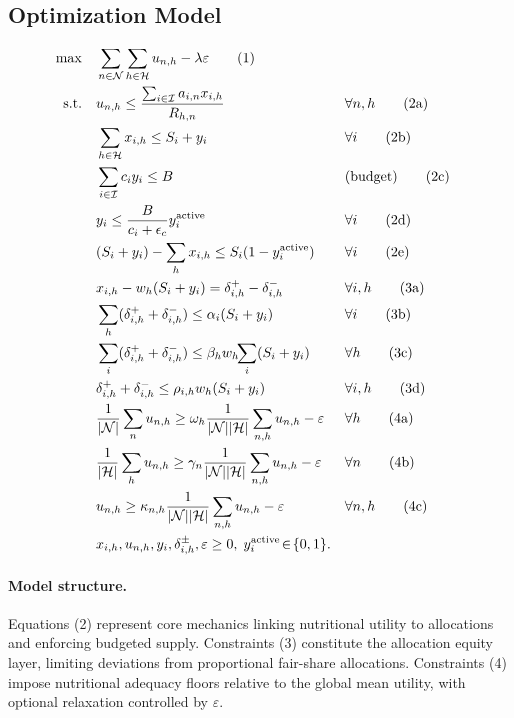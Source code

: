 \documentclass[preprint,12pt]{elsarticle}
\begin{document}
\subsection{Optimization Model}
\begin{align}
\max \quad & \sum_{n \in \mathcal{N}}\sum_{h \in \mathcal{H}} u_{n,h} - \lambda \varepsilon \tag{1}\\
\text{s.t.}\quad 
& u_{n,h} \le \frac{\sum_{i \in \mathcal{I}} a_{i,n} x_{i,h}}{R_{h,n}} && \forall n,h \tag{2a}\\
& \sum_{h \in \mathcal{H}} x_{i,h} \le S_i + y_i && \forall i \tag{2b}\\
& \sum_{i \in \mathcal{I}} c_i y_i \le B && \text{(budget)} \tag{2c}\\
& y_i \le \frac{B}{c_i+\epsilon_c} y_i^{\mathrm{active}} && \forall i \tag{2d}\\
& (S_i+y_i) - \sum_{h} x_{i,h} \le S_i(1-y_i^{\mathrm{active}}) && \forall i \tag{2e}\\
& x_{i,h} - w_h(S_i+y_i) = \delta_{i,h}^{+}-\delta_{i,h}^{-} && \forall i,h \tag{3a}\\
& \sum_{h} (\delta_{i,h}^{+}+\delta_{i,h}^{-}) \le \alpha_i (S_i+y_i) && \forall i \tag{3b}\\
& \sum_{i} (\delta_{i,h}^{+}+\delta_{i,h}^{-}) \le \beta_h w_h\!\!\sum_{i}(S_i+y_i) && \forall h \tag{3c}\\
& \delta_{i,h}^{+}+\delta_{i,h}^{-} \le \rho_{i,h}w_h(S_i+y_i) && \forall i,h \tag{3d}\\
& \frac{1}{|\mathcal{N}|}\sum_{n} u_{n,h} \ge \omega_h \frac{1}{|\mathcal{N}||\mathcal{H}|}\sum_{n,h} u_{n,h} - \varepsilon && \forall h \tag{4a}\\
& \frac{1}{|\mathcal{H}|}\sum_{h} u_{n,h} \ge \gamma_n \frac{1}{|\mathcal{N}||\mathcal{H}|}\sum_{n,h} u_{n,h} - \varepsilon && \forall n \tag{4b}\\
& u_{n,h} \ge \kappa_{n,h} \frac{1}{|\mathcal{N}||\mathcal{H}|}\sum_{n,h} u_{n,h} - \varepsilon && \forall n,h \tag{4c}\\
& x_{i,h},u_{n,h},y_i,\delta_{i,h}^{\pm},\varepsilon \ge 0,\; y_i^{\mathrm{active}}\!\in\!\{0,1\}. \notag
\end{align}

\paragraph{Model structure.}
Equations (2) represent core mechanics linking nutritional utility to allocations and enforcing budgeted supply. Constraints (3) constitute the allocation equity layer, limiting deviations from proportional fair-share allocations. Constraints (4) impose nutritional adequacy floors relative to the global mean utility, with optional relaxation controlled by $\varepsilon$.
\end{document}

